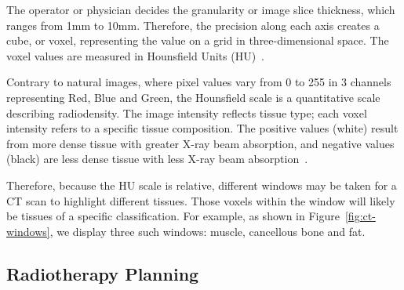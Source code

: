 \documentclass[12pt,twoside]{report}
\begin{document}
The operator or physician decides the granularity or image slice thickness, which ranges from 1mm to 10mm. Therefore, the precision along each axis creates a cube, or voxel, representing the value on a grid in three-dimensional space. The voxel values are measured in Hounsfield Units (HU)~\cite{diagnostic-radiology-physics}. 

Contrary to natural images, where pixel values vary from 0 to 255 in 3 channels representing Red, Blue and Green, the Hounsfield scale is a quantitative scale describing radiodensity. The image intensity reflects tissue type; each voxel intensity refers to a specific tissue composition. The positive values (white) result from more dense tissue with greater X-ray beam absorption, and negative values (black) are less dense tissue with less X-ray beam absorption~\cite{Statpearls}.  

Therefore, because the HU scale is relative, different windows may be taken for a CT scan to highlight different tissues. Those voxels within the window will likely be tissues of a specific classification. For example, as shown in Figure~\ref{fig:ct-windows}, we display three such windows: muscle, cancellous bone and fat.

\subsection{Radiotherapy Planning}\label{sect:radiotherapy-planning}
\end{document}
